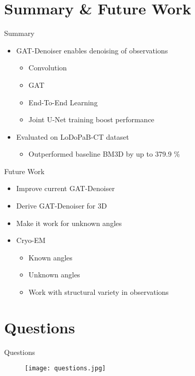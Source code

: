 

\section{Summary \& Future Work}

\begin{frame}{Summary}
  \begin{itemize}
    \item GAT-Denoiser enables denoising of observations
    \begin{itemize}
      \item Convolution
      \item GAT
      \item End-To-End Learning
      \item Joint U-Net training boost performance
    \end{itemize}
    \item<2> Evaluated on LoDoPaB-CT dataset
    \begin{itemize}
      \item Outperformed baseline BM3D by up to 379.9 \%
    \end{itemize}
  \end{itemize}
\end{frame}

\begin{frame}{Future Work}

  \begin{itemize}
    \item Improve current GAT-Denoiser
    \item Derive GAT-Denoiser for 3D
    \item Make it work for unknown angles
    \item<2> Cryo-EM
    \begin{itemize}
      \item Known angles
      \item Unknown angles
      \item Work with structural variety in observations
    \end{itemize}
  \end{itemize}

\end{frame}

\section{Questions}
\begin{frame}[c]{Questions}
  \begin{figure}
    \centering
    \texttt{[image: questions.jpg]}
  \end{figure}
\end{frame}

